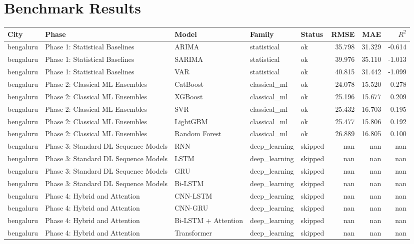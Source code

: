 \documentclass[11pt,a4paper,oneside]{book}
\begin{document}
\chapter{Benchmark Results}
\begin{longtable}{@{}lllllrrr@{}}
\toprule
City & Phase & Model & Family & Status & RMSE & MAE & $R^2$ \\
\midrule
bengaluru & Phase 1: Statistical Baselines & ARIMA & statistical & ok & 35.798 & 31.329 & -0.614 \\
bengaluru & Phase 1: Statistical Baselines & SARIMA & statistical & ok & 39.976 & 35.110 & -1.013 \\
bengaluru & Phase 1: Statistical Baselines & VAR & statistical & ok & 40.815 & 31.442 & -1.099 \\
bengaluru & Phase 2: Classical ML Ensembles & CatBoost & classical\_ml & ok & 24.078 & 15.520 & 0.278 \\
bengaluru & Phase 2: Classical ML Ensembles & XGBoost & classical\_ml & ok & 25.196 & 15.677 & 0.209 \\
bengaluru & Phase 2: Classical ML Ensembles & SVR & classical\_ml & ok & 25.432 & 16.703 & 0.195 \\
bengaluru & Phase 2: Classical ML Ensembles & LightGBM & classical\_ml & ok & 25.477 & 15.806 & 0.192 \\
bengaluru & Phase 2: Classical ML Ensembles & Random Forest & classical\_ml & ok & 26.889 & 16.805 & 0.100 \\
bengaluru & Phase 3: Standard DL Sequence Models & RNN & deep\_learning & skipped & nan & nan & nan \\
bengaluru & Phase 3: Standard DL Sequence Models & LSTM & deep\_learning & skipped & nan & nan & nan \\
bengaluru & Phase 3: Standard DL Sequence Models & GRU & deep\_learning & skipped & nan & nan & nan \\
bengaluru & Phase 3: Standard DL Sequence Models & Bi-LSTM & deep\_learning & skipped & nan & nan & nan \\
bengaluru & Phase 4: Hybrid and Attention & CNN-LSTM & deep\_learning & skipped & nan & nan & nan \\
bengaluru & Phase 4: Hybrid and Attention & CNN-GRU & deep\_learning & skipped & nan & nan & nan \\
bengaluru & Phase 4: Hybrid and Attention & Bi-LSTM + Attention & deep\_learning & skipped & nan & nan & nan \\
bengaluru & Phase 4: Hybrid and Attention & Transformer & deep\_learning & skipped & nan & nan & nan \\

\end{longtable}
\end{document}
